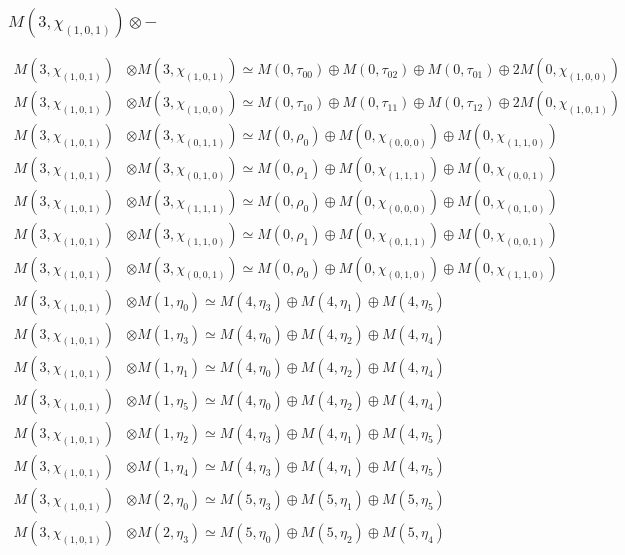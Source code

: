 \subsubsection{$ M(3,\chi_{(1,0,1)})\otimes -$}
\begin{align*}
M(3,\chi_{(1,0,1)}) &\otimes M(3,\chi_{(1,0,1)}) \simeq M(0,\tau_{00}) \oplus M(0,\tau_{02}) \oplus M(0,\tau_{01}) \oplus 2 M(0,\chi_{(1,0,0)})\\
M(3,\chi_{(1,0,1)}) &\otimes M(3,\chi_{(1,0,0)}) \simeq M(0,\tau_{10}) \oplus M(0,\tau_{11}) \oplus M(0,\tau_{12}) \oplus 2 M(0,\chi_{(1,0,1)})\\
M(3,\chi_{(1,0,1)}) &\otimes M(3,\chi_{(0,1,1)}) \simeq M(0,\rho_{0}) \oplus M(0,\chi_{(0,0,0)}) \oplus M(0,\chi_{(1,1,0)})\\
M(3,\chi_{(1,0,1)}) &\otimes M(3,\chi_{(0,1,0)}) \simeq M(0,\rho_{1}) \oplus M(0,\chi_{(1,1,1)}) \oplus M(0,\chi_{(0,0,1)})\\
M(3,\chi_{(1,0,1)}) &\otimes M(3,\chi_{(1,1,1)}) \simeq M(0,\rho_{0}) \oplus M(0,\chi_{(0,0,0)}) \oplus M(0,\chi_{(0,1,0)})\\
M(3,\chi_{(1,0,1)}) &\otimes M(3,\chi_{(1,1,0)}) \simeq M(0,\rho_{1}) \oplus M(0,\chi_{(0,1,1)}) \oplus M(0,\chi_{(0,0,1)})\\
M(3,\chi_{(1,0,1)}) &\otimes M(3,\chi_{(0,0,1)}) \simeq M(0,\rho_{0}) \oplus M(0,\chi_{(0,1,0)}) \oplus M(0,\chi_{(1,1,0)})\\
M(3,\chi_{(1,0,1)}) &\otimes M(1,\eta_{0}) \simeq M(4,\eta_{3}) \oplus M(4,\eta_{1}) \oplus M(4,\eta_{5})\\
M(3,\chi_{(1,0,1)}) &\otimes M(1,\eta_{3}) \simeq M(4,\eta_{0}) \oplus M(4,\eta_{2}) \oplus M(4,\eta_{4})\\
M(3,\chi_{(1,0,1)}) &\otimes M(1,\eta_{1}) \simeq M(4,\eta_{0}) \oplus M(4,\eta_{2}) \oplus M(4,\eta_{4})\\
M(3,\chi_{(1,0,1)}) &\otimes M(1,\eta_{5}) \simeq M(4,\eta_{0}) \oplus M(4,\eta_{2}) \oplus M(4,\eta_{4})\\
M(3,\chi_{(1,0,1)}) &\otimes M(1,\eta_{2}) \simeq M(4,\eta_{3}) \oplus M(4,\eta_{1}) \oplus M(4,\eta_{5})\\
M(3,\chi_{(1,0,1)}) &\otimes M(1,\eta_{4}) \simeq M(4,\eta_{3}) \oplus M(4,\eta_{1}) \oplus M(4,\eta_{5})\\
M(3,\chi_{(1,0,1)}) &\otimes M(2,\eta_{0}) \simeq M(5,\eta_{3}) \oplus M(5,\eta_{1}) \oplus M(5,\eta_{5})\\
M(3,\chi_{(1,0,1)}) &\otimes M(2,\eta_{3}) \simeq M(5,\eta_{0}) \oplus M(5,\eta_{2}) \oplus M(5,\eta_{4})\\

\end{align*}
